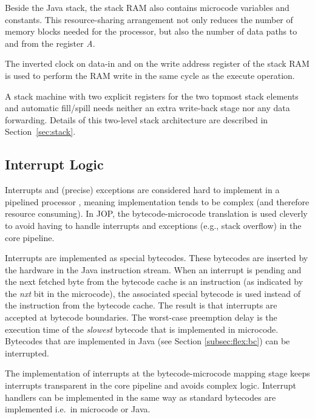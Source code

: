 Beside the Java stack, the stack RAM also contains microcode
variables and constants. This resource-sharing arrangement not only
reduces the number of memory blocks needed for the processor, but
also the number of data paths to and from the register \nolinebreak
\emph{A}.

The inverted clock on data-in and on the write address register of
the stack RAM is used to perform the RAM write in the same cycle as
the execute operation.

A stack machine with two explicit registers for the two topmost
stack elements and automatic fill/spill needs neither an extra
write-back stage nor any data forwarding. Details of this two-level
stack architecture are described in Section~\ref{sec:stack}.

%
%

\subsection{Interrupt Logic}
\label{sec:interrupt}

Interrupts and (precise) exceptions are considered hard to implement
in a pipelined processor \cite{Hennessy02}, meaning implementation
tends to be complex (and therefore resource consuming). In JOP, the
bytecode-microcode translation is used cleverly to avoid having to
handle interrupts and exceptions (e.g., stack overflow) in the core
pipeline.

Interrupts are implemented as special bytecodes. These bytecodes are
inserted by the hardware in the Java instruction stream. When an
interrupt is pending and the next fetched byte from the bytecode
cache is an instruction (as indicated by the \emph{nxt} bit in the
microcode), the associated special bytecode is used instead of the
instruction from the bytecode cache. The result is that interrupts
are accepted at bytecode boundaries. The worst-case preemption delay
is the execution time of the \emph{slowest} bytecode that is
implemented in microcode. Bytecodes that are implemented in Java
(see Section \ref{subsec:flex:bc}) can be interrupted.

The implementation of interrupts at the bytecode-microcode mapping
stage keeps interrupts transparent in the core pipeline and avoids
complex logic. Interrupt handlers can be implemented in the same way
as standard bytecodes are implemented i.e.\ in microcode or Java.

